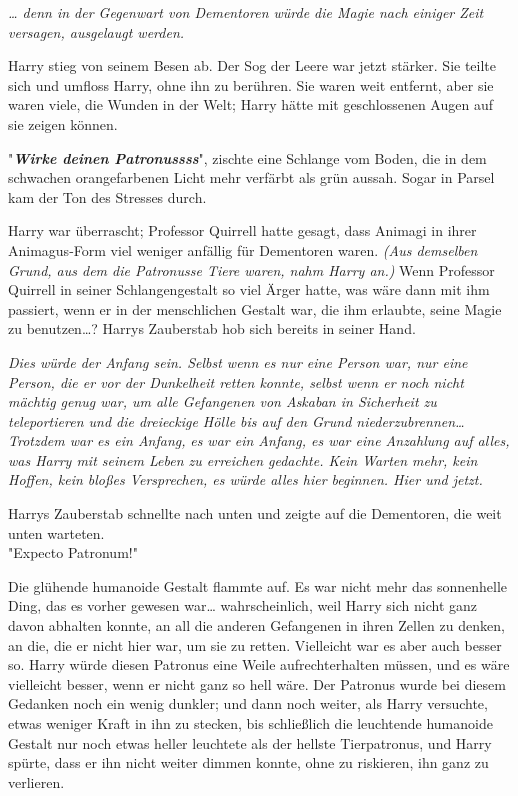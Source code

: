 {\emph{… denn in der Gegenwart von Dementoren würde die Magie nach einiger Zeit versagen, ausgelaugt werden.}

Harry stieg von seinem Besen ab. Der Sog der Leere war jetzt stärker. Sie teilte sich und umfloss Harry, ohne ihn zu berühren. Sie waren weit entfernt, aber sie waren viele, die Wunden in der Welt; Harry hätte mit geschlossenen Augen auf sie zeigen können.

"\textbf{\emph{Wirke deinen Patronussss}}", zischte eine Schlange vom Boden, die in dem schwachen orangefarbenen Licht mehr verfärbt als grün aussah. Sogar in Parsel kam der Ton des Stresses durch.

Harry war überrascht; Professor Quirrell hatte gesagt, dass Animagi in ihrer Animagus-Form viel weniger anfällig für Dementoren waren. \emph{(Aus demselben Grund, aus dem die Patronusse Tiere waren, nahm Harry an.)} Wenn Professor Quirrell in seiner Schlangengestalt so viel Ärger hatte, was wäre dann mit ihm passiert, wenn er in der menschlichen Gestalt war, die ihm erlaubte, seine Magie zu benutzen…? Harrys Zauberstab hob sich bereits in seiner Hand.

\emph{Dies würde der Anfang sein. Selbst wenn es nur eine Person war, nur eine Person, die er vor der Dunkelheit retten konnte, selbst wenn er noch nicht mächtig genug war, um alle Gefangenen von Askaban in Sicherheit zu teleportieren und die dreieckige Hölle bis auf den Grund niederzubrennen… Trotzdem war es ein Anfang,} \emph{es war ein Anfang, es war eine Anzahlung auf alles, was Harry mit seinem Leben zu erreichen gedachte. Kein Warten mehr, kein Hoffen, kein bloßes Versprechen, es würde alles hier beginnen. Hier und jetzt.}

Harrys Zauberstab schnellte nach unten und zeigte auf die Dementoren, die weit unten warteten.\\

"Expecto Patronum!"

Die glühende humanoide Gestalt flammte auf. Es war nicht mehr das sonnenhelle Ding, das es vorher gewesen war… wahrscheinlich, weil Harry sich nicht ganz davon abhalten konnte, an all die anderen Gefangenen in ihren Zellen zu denken, an die, die er nicht hier war, um sie zu retten. Vielleicht war es aber auch besser so. Harry würde diesen Patronus eine Weile aufrechterhalten müssen, und es wäre vielleicht besser, wenn er nicht ganz so hell wäre. Der Patronus wurde bei diesem Gedanken noch ein wenig dunkler; und dann noch weiter, als Harry versuchte, etwas weniger Kraft in ihn zu stecken, bis schließlich die leuchtende humanoide Gestalt nur noch etwas heller leuchtete als der hellste Tierpatronus, und Harry spürte, dass er ihn nicht weiter dimmen konnte, ohne zu riskieren, ihn ganz zu verlieren.

}
